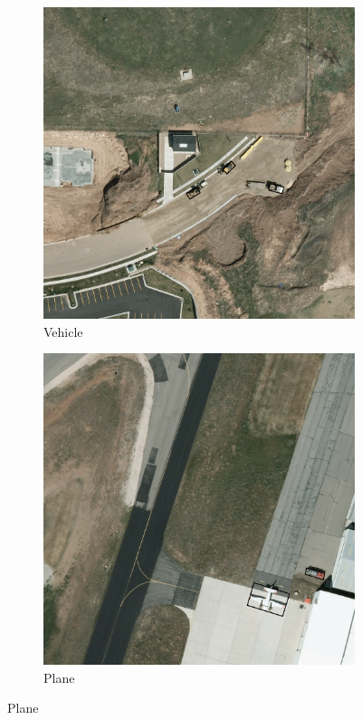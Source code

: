 \begin{figure}[h!]
    \begin{subfigure}[t]{0.38\textwidth}
        \centering
        \includegraphics[width=\linewidth]{images/015Results/01abb_vs_obb/comp_images/ground_truth_obb/427.png}
        \caption{Vehicle}
    \end{subfigure}
    \begin{subfigure}[t]{0.38\textwidth}
        \centering
        \includegraphics[width=\linewidth]{images/015Results/01abb_vs_obb/comp_images/ground_truth_obb/487.png}
        \caption{Plane}
    \end{subfigure}
    

\end{figure}
